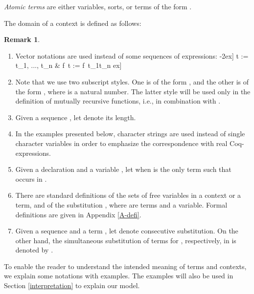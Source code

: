 \documentclass{LMCS}
\theoremstyle{plain}
\theoremstyle{definition}
\newtheorem{remm}[thm]{Remark}
\def\oto{\overrightarrow}
\begin{document}
\begin{defi}
\emph{Atomic terms} are either variables, sorts, or terms of the form .
\end{defi}

\begin{defi}
The domain of a context is defined as follows:

\end{defi}

\begin{remm}\hfill
\begin{enumerate}[(1)]
\item Vector notations are used instead of some sequences of expressions:
-2ex]
\vec t  :=  t_1, ..., t_n &  f\, \vec t := f\, t_1\cdots t_n \1ex]
\multicolumn{2}{|l|}{\bullet\,\,\oto{x / k :A := t} :=  x_0 / k_0 : A_0 := t_0, ...  , x_n / k_n : A_n := t_n}\

\item Note that we use two subscript styles. One is of the form , and the other is of the form , where  is a natural number. The latter style will be used only in the definition of mutually recursive functions, i.e., in combination with .\smallskip

\item Given a sequence , let  denote its length.\smallskip

\item In the examples presented below, character strings are used instead of single character variables in order to emphasize the correspondence with real Coq-expressions.\smallskip

\item Given a declaration  and a variable , let  when  is the only term such that  occurs in .\smallskip

\item There are standard definitions of the sets of free variables in a context or a term, and of the substitution , where  are terms and  a variable. Formal definitions are given in Appendix \ref{A-defi}.\smallskip

\item Given a sequence  and a term , let  denote consecutive substitution. 
On the other hand, the simultaneous substitution of terms  for , respectively, in  is denoted by .

\end{enumerate}
\end{remm}

\noindent To enable the reader to understand the intended meaning of terms and contexts, we explain some notations with examples. The examples will also be used in Section \ref{interpretation} to explain our model.
\end{document}
